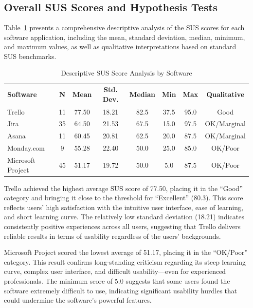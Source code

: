 \documentclass[runningheads]{llncs}
\begin{document}
\subsection{Overall SUS Scores and Hypothesis Tests}
Table~\ref{table:SUS-Software} presents a comprehensive descriptive analysis of the SUS scores for each software application, including the mean, standard deviation, median, minimum, and maximum values, as well as qualitative interpretations based on standard SUS benchmarks.

\begin{table}[h]
\caption{Descriptive SUS Score Analysis by Software}\label{table:SUS-Software}
\centering
\begin{tabular}{l c c c c c c c}
\toprule
\textbf{Software} & \textbf{N} & \textbf{Mean} & \textbf{Std. Dev.} & \textbf{Median} & \textbf{Min} & \textbf{Max} & \textbf{Qualitative} \\
\midrule
Trello & 11 & 77.50 & 18.21 & 82.5 & 37.5 & 95.0 & Good \\
Jira & 35 & 64.50 & 21.53 & 67.5 & 15.0 & 97.5 & OK/Marginal \\
Asana & 11 & 60.45 & 20.81 & 62.5 & 20.0 & 87.5 & OK/Marginal \\
Monday.com & 9 & 55.28 & 22.40 & 50.0 & 25.0 & 85.0 & OK/Poor \\
Microsoft Project & 45 & 51.17 & 19.72 & 50.0 & 5.0 & 87.5 & OK/Poor \\
\bottomrule
\end{tabular}
\end{table}


Trello achieved the highest average SUS score of 77.50, placing it in the “Good” category and bringing it close to the threshold for “Excellent” (80.3). This score reflects users’ high satisfaction with the intuitive user interface, ease of learning, and short learning curve. The relatively low standard deviation (18.21) indicates consistently positive experiences across all users, suggesting that Trello delivers reliable results in terms of usability regardless of the users’ backgrounds.


Microsoft Project scored the lowest average of 51.17, placing it in the “OK/Poor” category. This result confirms long-standing criticism regarding its steep learning curve, complex user interface, and difficult usability—even for experienced professionals. The minimum score of 5.0 suggests that some users found the software extremely difficult to use, indicating significant usability hurdles that could undermine the software’s powerful features.
\end{document}
